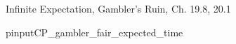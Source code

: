 \documentclass[handout]{mcs}
\begin{document}


\begin{staffnotes}
Infinite Expectation, Gambler's Ruin, Ch. 19.8, 20.1
\end{staffnotes}


\begin{staffnotes}
pinput{CP_gambler_fair_expected_time}
\end{staffnotes}

\end{document}
